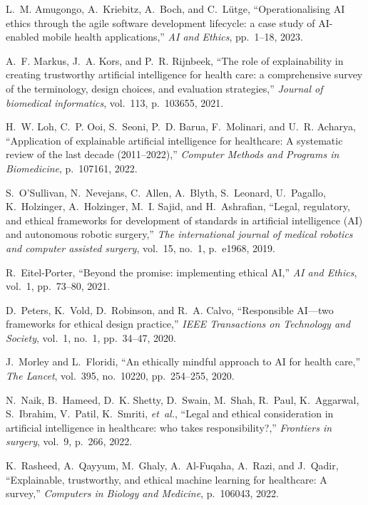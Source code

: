 \documentclass{article}
\begin{document}
\begin{thebibliography}{100}
	L.~M. Amugongo, A.~Kriebitz, A.~Boch, and C.~L{\"u}tge, ``Operationalising {AI}
	ethics through the agile software development lifecycle: a case study of
	{AI}-enabled mobile health applications,'' {\em {AI} and Ethics}, pp.~1--18,
	2023.
	
	A.~F. Markus, J.~A. Kors, and P.~R. Rijnbeek, ``The role of explainability in
	creating trustworthy artificial intelligence for health care: a comprehensive
	survey of the terminology, design choices, and evaluation strategies,'' {\em
		Journal of biomedical informatics}, vol.~113, p.~103655, 2021.
	
	H.~W. Loh, C.~P. Ooi, S.~Seoni, P.~D. Barua, F.~Molinari, and U.~R. Acharya,
	``Application of explainable artificial intelligence for healthcare: A
	systematic review of the last decade (2011--2022),'' {\em Computer Methods
		and Programs in Biomedicine}, p.~107161, 2022.
	
	S.~O'Sullivan, N.~Nevejans, C.~Allen, A.~Blyth, S.~Leonard, U.~Pagallo,
	K.~Holzinger, A.~Holzinger, M.~I. Sajid, and H.~Ashrafian, ``Legal,
	regulatory, and ethical frameworks for development of standards in artificial
	intelligence ({AI}) and autonomous robotic surgery,'' {\em The international
		journal of medical robotics and computer assisted surgery}, vol.~15, no.~1,
	p.~e1968, 2019.
	
	R.~Eitel-Porter, ``Beyond the promise: implementing ethical {AI},'' {\em {AI}
		and Ethics}, vol.~1, pp.~73--80, 2021.
	
	D.~Peters, K.~Vold, D.~Robinson, and R.~A. Calvo, ``Responsible {AI}—two
	frameworks for ethical design practice,'' {\em IEEE Transactions on
		Technology and Society}, vol.~1, no.~1, pp.~34--47, 2020.
	
	J.~Morley and L.~Floridi, ``An ethically mindful approach to {AI} for health
	care,'' {\em The Lancet}, vol.~395, no.~10220, pp.~254--255, 2020.
	
	N.~Naik, B.~Hameed, D.~K. Shetty, D.~Swain, M.~Shah, R.~Paul, K.~Aggarwal,
	S.~Ibrahim, V.~Patil, K.~Smriti, {\em et~al.}, ``Legal and ethical
	consideration in artificial intelligence in healthcare: who takes
	responsibility?,'' {\em Frontiers in surgery}, vol.~9, p.~266, 2022.
	
	K.~Rasheed, A.~Qayyum, M.~Ghaly, A.~Al-Fuqaha, A.~Razi, and J.~Qadir,
	``Explainable, trustworthy, and ethical machine learning for healthcare: A
	survey,'' {\em Computers in Biology and Medicine}, p.~106043, 2022.
	

\end{thebibliography}
\end{document}
